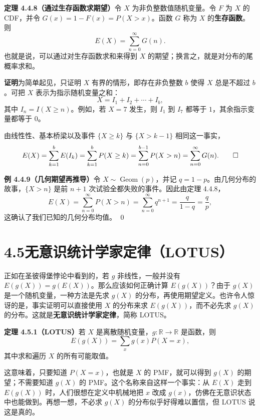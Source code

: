 \documentclass[UTF8, 12pt, fontset=fandol, oneside]{ctexart}
\begin{document}
\noindent\textbf{定理 4.4.8（通过生存函数求期望）}\quad 令 $X$ 为非负整数值随机变量。令 $F$ 为 $X$ 的 CDF，并令 $G(x)=1-F(x)=P(X>x)$。函数 $G$ 称为 $X$ 的\textbf{生存函数}。则
\[
  E(X)=\sum_{n=0}^{\infty}G(n).
\]
也就是说，可以通过对生存函数求和来得到 $X$ 的期望；换言之，就是对分布的尾概率求和。

\noindent\textbf{证明}\quad 为简单起见，只证明 $X$ 有界的情形，即存在非负整数 $b$ 使得 $X$ 总是不超过 $b$。可把 $X$ 表示为指示随机变量之和：
\[
  X=I_1+I_2+\cdots+I_b,
\]
其中 $I_n=I(X\ge n)$。例如，若 $X=7$ 发生，则 $I_1$ 到 $I_7$ 都等于 $1$，其余指示变量都等于 $0$。

由线性性、基本桥梁以及事件 $\{X\ge k\}$ 与 $\{X>k-1\}$ 相同这一事实，
\[
  E(X)=\sum_{k=1}^b E(I_k)
  =\sum_{k=1}^b P(X\ge k)
  =\sum_{n=0}^{b-1}P(X>n)
  =\sum_{n=0}^{\infty}G(n). \qed
\]

\noindent\textbf{例 4.4.9（几何期望再推导）}\quad 令 $X\sim\operatorname{Geom}(p)$，并记 $q=1-p$。由几何分布的故事，$\{X>n\}$ 是前 $n+1$ 次试验全都失败的事件。因此由定理 4.4.8，
\[
  E(X)=\sum_{n=0}^{\infty}P(X>n)
  =\sum_{n=0}^{\infty}q^{n+1}
  =\frac{q}{1-q}
  =\frac{q}{p},
\]
这确认了我们已知的几何分布均值。 \qed

\section*{4.5\quad 无意识统计学家定律（LOTUS）}

正如在圣彼得堡悖论中看到的，若 $g$ 非线性，一般并没有 $E(g(X))=g(E(X))$。那么应该如何正确计算 $E(g(X))$？由于 $g(X)$ 是一个随机变量，一种方法是先求 $g(X)$ 的分布，再使用期望定义。也许令人惊讶的是，事实证明可以直接使用 $X$ 的分布来求 $E(g(X))$，而不必先求 $g(X)$ 的分布。这就是\textbf{无意识统计学家定律}，简称 LOTUS。

\noindent\textbf{定理 4.5.1（LOTUS）}\quad 若 $X$ 是离散随机变量，$g:\mathbb{R}\to\mathbb{R}$ 是函数，则
\[
  E(g(X))=\sum_x g(x)P(X=x),
\]
其中求和遍历 $X$ 的所有可能取值。

这意味着，只要知道 $P(X=x)$，也就是 $X$ 的 PMF，就可以得到 $g(X)$ 的期望；不需要知道 $g(X)$ 的 PMF。这个名称来自这样一个事实：从 $E(X)$ 走到 $E(g(X))$ 时，人们很想在定义中机械地把 $x$ 改成 $g(x)$，仿佛在无意识状态中也能做到。再想一想，不必求 $g(X)$ 的分布似乎好得难以置信，但 LOTUS 说这是真的。
\end{document}

